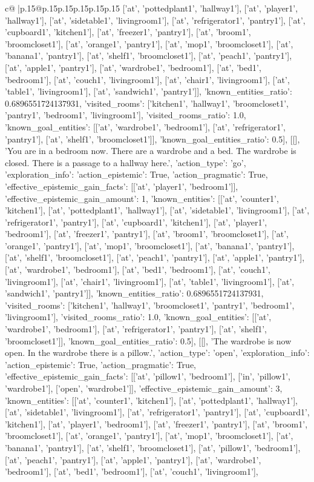 \documentclass{article}
\begin{document}
{\begin{supertabular}{c@{$\;$}|p{.15\linewidth}@{}p{.15\linewidth}p{.15\linewidth}p{.15\linewidth}p{.15\linewidth}p{.15\linewidth}}
{{{['at', 'pottedplant1', 'hallway1'], ['at', 'player1', 'hallway1'], ['at', 'sidetable1', 'livingroom1'], ['at', 'refrigerator1', 'pantry1'], ['at', 'cupboard1', 'kitchen1'], ['at', 'freezer1', 'pantry1'], ['at', 'broom1', 'broomcloset1'], ['at', 'orange1', 'pantry1'], ['at', 'mop1', 'broomcloset1'], ['at', 'banana1', 'pantry1'], ['at', 'shelf1', 'broomcloset1'], ['at', 'peach1', 'pantry1'], ['at', 'apple1', 'pantry1'], ['at', 'wardrobe1', 'bedroom1'], ['at', 'bed1', 'bedroom1'], ['at', 'couch1', 'livingroom1'], ['at', 'chair1', 'livingroom1'], ['at', 'table1', 'livingroom1'], ['at', 'sandwich1', 'pantry1']], 'known_entities_ratio': 0.6896551724137931, 'visited_rooms': ['kitchen1', 'hallway1', 'broomcloset1', 'pantry1', 'bedroom1', 'livingroom1'], 'visited_rooms_ratio': 1.0, 'known_goal_entities': [['at', 'wardrobe1', 'bedroom1'], ['at', 'refrigerator1', 'pantry1'], ['at', 'shelf1', 'broomcloset1']], 'known_goal_entities_ratio': 0.5}}], [[], 'You are in a bedroom now. There are a wardrobe and a bed. The wardrobe is closed. There is a passage to a hallway here.', {'action_type': 'go', 'exploration_info': {'action_epistemic': True, 'action_pragmatic': True, 'effective_epistemic_gain_facts': [['at', 'player1', 'bedroom1']], 'effective_epistemic_gain_amount': 1, 'known_entities': [['at', 'counter1', 'kitchen1'], ['at', 'pottedplant1', 'hallway1'], ['at', 'sidetable1', 'livingroom1'], ['at', 'refrigerator1', 'pantry1'], ['at', 'cupboard1', 'kitchen1'], ['at', 'player1', 'bedroom1'], ['at', 'freezer1', 'pantry1'], ['at', 'broom1', 'broomcloset1'], ['at', 'orange1', 'pantry1'], ['at', 'mop1', 'broomcloset1'], ['at', 'banana1', 'pantry1'], ['at', 'shelf1', 'broomcloset1'], ['at', 'peach1', 'pantry1'], ['at', 'apple1', 'pantry1'], ['at', 'wardrobe1', 'bedroom1'], ['at', 'bed1', 'bedroom1'], ['at', 'couch1', 'livingroom1'], ['at', 'chair1', 'livingroom1'], ['at', 'table1', 'livingroom1'], ['at', 'sandwich1', 'pantry1']], 'known_entities_ratio': 0.6896551724137931, 'visited_rooms': ['kitchen1', 'hallway1', 'broomcloset1', 'pantry1', 'bedroom1', 'livingroom1'], 'visited_rooms_ratio': 1.0, 'known_goal_entities': [['at', 'wardrobe1', 'bedroom1'], ['at', 'refrigerator1', 'pantry1'], ['at', 'shelf1', 'broomcloset1']], 'known_goal_entities_ratio': 0.5}}], [[], 'The wardrobe is now open. In the wardrobe there is a pillow.', {'action_type': 'open', 'exploration_info': {'action_epistemic': True, 'action_pragmatic': True, 'effective_epistemic_gain_facts': [['at', 'pillow1', 'bedroom1'], ['in', 'pillow1', 'wardrobe1'], ['open', 'wardrobe1']], 'effective_epistemic_gain_amount': 3, 'known_entities': [['at', 'counter1', 'kitchen1'], ['at', 'pottedplant1', 'hallway1'], ['at', 'sidetable1', 'livingroom1'], ['at', 'refrigerator1', 'pantry1'], ['at', 'cupboard1', 'kitchen1'], ['at', 'player1', 'bedroom1'], ['at', 'freezer1', 'pantry1'], ['at', 'broom1', 'broomcloset1'], ['at', 'orange1', 'pantry1'], ['at', 'mop1', 'broomcloset1'], ['at', 'banana1', 'pantry1'], ['at', 'shelf1', 'broomcloset1'], ['at', 'pillow1', 'bedroom1'], ['at', 'peach1', 'pantry1'], ['at', 'apple1', 'pantry1'], ['at', 'wardrobe1', 'bedroom1'], ['at', 'bed1', 'bedroom1'], ['at', 'couch1', 'livingroom1'], }}}
\end{supertabular}}
\end{document}
